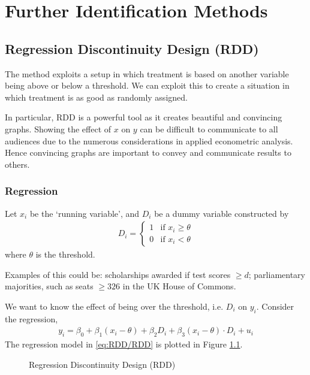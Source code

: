 \chapter{Further Identification Methods}
    \section{Regression Discontinuity Design (RDD)}
        The method exploits a setup in which treatment is based on another variable being above or below a threshold. We can exploit this to create a situation in which treatment is as good as randomly assigned.

    	In particular, RDD is a powerful tool as it creates beautiful and convincing graphs. Showing the effect of $x$ on $y$ can be difficult to communicate to all audiences due to the numerous considerations in applied econometric analysis. Hence convincing graphs are important to convey and communicate results to others.

        \subsection{Regression}
            Let $x_i$ be the `running variable', and $D_i$ be a dummy variable constructed by
            \begin{align}
                D_i =
                \begin{cases}
                    1 &\text{if }x_{i} \geq \theta   \\
                    0 &\text{if }x_{i} < \theta
                \end{cases}
            \end{align}
            where $\theta$ is the threshold.

            Examples of this could be: scholarships awarded if test scores $\geq d$; parliamentary majorities, such as seats $\geq 326$ in the UK House of Commons.

            We want to know the effect of being over the threshold, i.e. $D_i$ on $y_i$. Consider the regression,
            \begin{align}
                y_i = \beta_0 +\beta_1 (x_i-\theta) + \beta_2 D_i + \beta_3 (x_i-\theta)\cdot D_i+u_i \label{eq:RDD/RDD}
            \end{align}
            The regression model in \eqref{eq:RDD/RDD} is plotted in Figure \ref{fig:RDD/RDD}.
            \begin{figure}[h]
                \centering
                
                \caption{Regression Discontinuity Design (RDD)}
                \label{fig:RDD/RDD}
            \end{figure}

